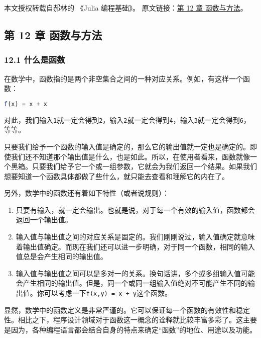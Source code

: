 
本文授权转载自郝林的 《Julia 编程基础》。 原文链接：\href{https://github.com/hyper0x/JuliaBasics/blob/master/book/ch11.md}{第 12 章 函数与方法}。

\subsection{第 12 章 函数与方法}

\subsubsection{12.1 什么是函数}

在数学中，函数指的是两个非空集合之间的一种对应关系。例如，有这样一个函数：

\begin{lstlisting}[language=julia]
f(x) = x + x
\end{lstlisting}

对此，我们输入\verb`1`就一定会得到\verb`2`，输入\verb`2`就一定会得到\verb`4`，输入\verb`3`就一定会得到\verb`6`，等等。

只要我们给予一个函数的输入值是确定的，那么它的输出值就一定也是确定的。即使我们还不知道那个输出值是什么，也是如此。所以，在使用者看来，函数就像一个黑箱。只要我们给予它一个或一组参数，它就会为我们返回一个结果。如果我们想要知道一个函数具体都做了些什么，就只能去查看和理解它的内在了。

另外，数学中的函数还有着如下特性（或者说规则）：

\begin{enumerate}
\item 只要有输入，就一定会输出。也就是说，对于每一个有效的输入值，函数都会返回一个输出值。
\item 输入值与输出值之间的对应关系是固定的。我们刚刚说过，输入值确定就意味着输出值确定。而现在我们还可以进一步明确，对于同一个函数，相同的输入值总是会产生相同的输出值。
\item 输入值与输出值之间可以是多对一的关系。换句话讲，多个或多组输入值可能会产生相同的输出值。但是，同一个或同一组输入值绝对不可能产生不同的输出值。你可以考虑一下\verb`f(x,y) = x + y`这个函数。
\end{enumerate}

显然，数学中的函数定义是非常严谨的。它可以保证每一个函数的有效性和稳定性。相比之下，程序设计领域对于函数这一概念的诠释就比较丰富多彩了。这主要是因为，各种编程语言都会结合自身的特点来确定“函数”的地位、用途以及功能。

